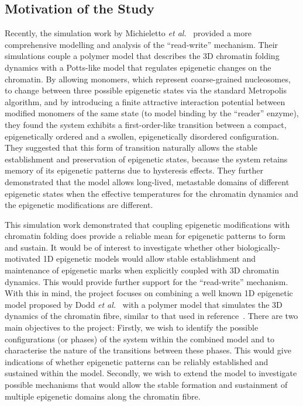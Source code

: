 \documentclass[12pt]{article}
\newcommand{\etal}{\emph{et al.}}
\begin{document}
\subsection{Motivation of the Study}
Recently, the simulation work by Michieletto \etal~\cite{michieletto2016} provided a more comprehensive modelling and analysis of the ``read-write'' mechanism. Their simulations couple a polymer model that describes the 3D chromatin folding dynamics with a Potts-like model that regulates epigenetic changes on the chromatin.  By allowing monomers, which represent coarse-grained nucleosomes, to change between three possible epigenetic states via the standard Metropolis algorithm, and by introducing a finite attractive interaction potential between modified monomers of the same state (to model binding by the ``reader'' enzyme), they found the system exhibits a first-order-like transition between a compact, epigenetically ordered and a swollen, epigenetically disordered configuration. They suggested that this form of transition naturally allows the stable establishment and preservation of epigenetic states, because the system retains memory of its epigenetic patterns due to hysteresis effects. They further demonstrated that the model allows long-lived, metastable domains of different epigenetic states when the effective temperatures for the chromatin dynamics and the epigenetic modifications are different. 

This simulation work demonstrated that coupling epigenetic modifications with chromatin folding does provide a reliable mean for epigenetic patterns to form and sustain. It would be of interest to investigate whether other biologically-motivated 1D epigenetic models would allow stable establishment and maintenance of epigenetic marks when explicitly coupled with 3D chromatin dynamics. This would provide further support for the ``read-write'' mechanism. With this in mind, the project focuses on combining a well known 1D epigenetic model proposed by Dodd \etal~\cite{dodd2007} with a polymer model that simulates the 3D dynamics of the chromatin fibre, similar to that used in reference~\cite{brackley2013, michieletto2016}. There are two main objectives to the project: Firstly, we wish to identify the possible configurations (or phases) of the system within the combined model and to characterise the nature of the transitions between these phases. This would give indications of whether epigenetic patterns can be reliably established and sustained within the model. Secondly, we wish to extend the model to investigate possible mechanisms that would allow the stable formation and sustainment of multiple epigenetic domains along the chromatin fibre. 
\end{document}
